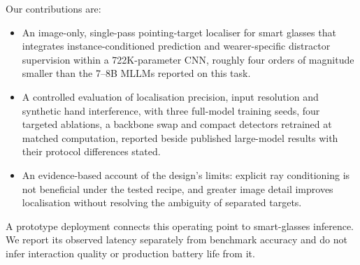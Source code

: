 Our contributions are:
\begin{itemize}
\item An image-only, single-pass pointing-target localiser for smart glasses that integrates instance-conditioned prediction and wearer-specific distractor supervision within a 722K-parameter CNN, roughly four orders of magnitude smaller than the 7--8B MLLMs reported on this task.
\item A controlled evaluation of localisation precision, input resolution and synthetic hand interference, with three full-model training seeds, four targeted ablations, a backbone swap and compact detectors retrained at matched computation, reported beside published large-model results with their protocol differences stated.
\item An evidence-based account of the design's limits: explicit ray conditioning is not beneficial under the tested recipe, and greater image detail improves localisation without resolving the ambiguity of separated targets.
\end{itemize}
A prototype deployment connects this operating point to smart-glasses inference. We report its observed latency separately from benchmark accuracy and do not infer interaction quality or production battery life from it.
